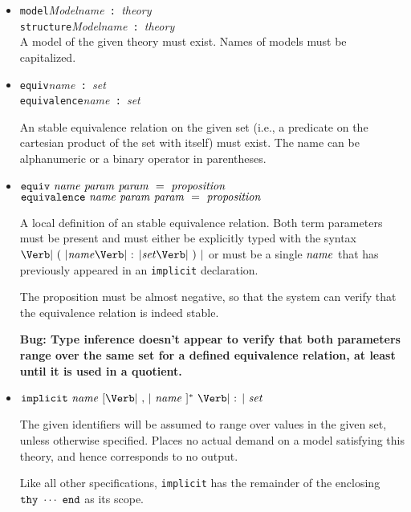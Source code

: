 \documentclass[12pt]{article}
\newcommand{\keywd}[1]{\mbox{\texttt{#1}}\xspace}
\newcommand{\EQUIV}{\keywd{equiv}}
\newcommand{\EQUIVALENCE}{\keywd{equivalence}}
\newcommand{\END}{\keywd{end}}
\newcommand{\IMPLICIT}{\keywd{implicit}}
\newcommand{\MODEL}{\keywd{model}}
\newcommand{\STRUCTURE}{\keywd{structure}}
\newcommand{\THY}{\keywd{thy}}
\newcommand{\metav}[1]{\mbox{\textit{#1}}\xspace}
\newcommand{\Ident}{\metav{name}}
\newcommand{\Identifier}{\Ident}
\newcommand{\MIdentifier}{\metav{Modelname}}
\newcommand{\Setexp}{\metav{set}}
\newcommand{\Proposition}{\metav{proposition}}
\newcommand{\Param}{\metav{param}}
\newcommand{\Theoryexp}{\metav{theory}}
\newcommand{\COLON}{\mbox{\Verb| : |}}
\newcommand{\COMMA}{\mbox{\Verb| , |}}
\newcommand{\LPAREN}{\mbox{\Verb| ( |}}
\newcommand{\RPAREN}{\mbox{\Verb| ) |}}
\begin{document}
\begin{itemize}
      Each model parameter, if present, must be written
      with the syntax $\LPAREN \MIdentifier \COLON \Theoryexp \RPAREN$.
      Each term parameter, if present, must either be
      explicitly typed with the syntax $\LPAREN \Identifier \COLON 
      \Setexp \RPAREN$ or must be a single $\Identifier$ that has
      previously appeared in an \IMPLICIT declaration.

      \textbf{Need to change the parser so that model parameters are
      surrounded by parentheses as stated here, rather than 
      square brackets.}

\item \MODEL \MIdentifier \COLON \Theoryexp\\
      \STRUCTURE \MIdentifier \COLON \Theoryexp\\

      A model of the given theory must exist.  Names of models must be
      capitalized.

\item \EQUIV \Identifier \COLON \Setexp\\
      \EQUIVALENCE \Identifier \COLON \Setexp
  
  An stable equivalence relation on the given set (i.e., a predicate on the
  cartesian product of the set with itself) must exist.  The
  name can be alphanumeric or a binary operator in parentheses.

\item $\EQUIV\ \Identifier\ \Param\ \Param\ =\ \Proposition$\\
      $\EQUIVALENCE\ \Identifier\ \Param\ \Param\ =\ \Proposition$
 
  A local definition of an stable equivalence relation.  Both term parameters
  must be present and must either be explicitly typed with the syntax
  $\LPAREN \Identifier \COLON \Setexp \RPAREN$ or must be a single
  $\Identifier$ that has previously appeared in an \IMPLICIT
  declaration.  

  The proposition must be almost negative, so that the system can 
  verify that the equivalence relation is indeed stable.

  \textbf{Bug:  Type inference doesn't appear to verify that both parameters 
  range over the same set for a defined equivalence relation, at least
  until it is used in a quotient.}
  
\item $\IMPLICIT\ \Identifier\ [\COMMA\ \Identifier\ ]^*\ \COLON\ \Setexp$
  
  The given identifiers will be assumed to range over values in the
  given set, unless otherwise specified.  Places no actual demand
  on a model satisfying this theory, and hence corresponds to
  no output.  
  
  Like all other specifications, \IMPLICIT has the remainder of the
  enclosing $\THY\ \cdots\ \END$ as its scope.
\end{itemize}
\end{document}
